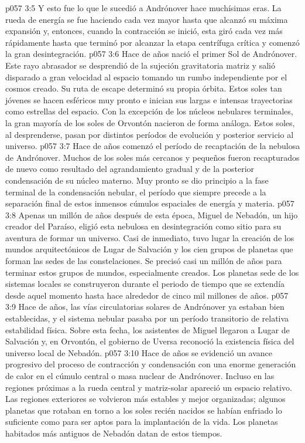 \vs p057 3:5 Y esto fue lo que le sucedió a Andrónover hace muchísimas eras. La rueda de energía se fue haciendo cada vez mayor hasta que alcanzó su máxima expansión y, entonces, cuando la contracción se inició, esta giró cada vez más rápidamente hasta que terminó por alcanzar la etapa centrífuga crítica y comenzó la gran desintegración.
\vs p057 3:6 \pc Hace  de años nació el primer Sol de Andrónover. Este rayo abrasador se desprendió de la sujeción gravitatoria matriz y salió disparado a gran velocidad al espacio tomando un rumbo independiente por el cosmos creado. Su ruta de escape determinó su propia órbita. Estos soles tan jóvenes se hacen esféricos muy pronto e inician sus largas e intensas trayectorias como estrellas del espacio. Con la excepción de los núcleos nebulares terminales, la gran mayoría de los soles de Orvontón nacieron de forma análoga. Estos soles, al desprenderse, pasan por distintos períodos de evolución y posterior servicio al universo.
\vs p057 3:7 \pc Hace  de años comenzó el período de recaptación de la nebulosa de Andrónover. Muchos de los soles más cercanos y pequeños fueron recapturados de nuevo como resultado del agrandamiento gradual y de la posterior condensación de su núcleo materno. Muy pronto se dio principio a la fase terminal de la condensación nebular, el período que siempre precede a la separación final de estos inmensos cúmulos espaciales de energía y materia.
\vs p057 3:8 Apenas un millón de años después de esta época, Miguel de Nebadón, un hijo creador del Paraíso, eligió esta nebulosa en desintegración como sitio para su aventura de formar un universo. Casi de inmediato, tuvo lugar la creación de los mundos arquitectónicos de Lugar de Salvación y los cien grupos de planetas que forman las sedes de las constelaciones. Se precisó casi un millón de años para terminar estos grupos de mundos, especialmente creados. Los planetas sede de los sistemas locales se construyeron durante el periodo de tiempo que se extendía desde aquel momento hasta hace alrededor de cinco mil millones de años.
\vs p057 3:9 \pc Hace  de años, las vías circulatorias solares de Andrónover ya estaban bien establecidas, y el sistema nebular pasaba por un período transitorio de relativa estabilidad física. Sobre esta fecha, los asistentes de Miguel llegaron a Lugar de Salvación y, en Orvontón, el gobierno de Uversa reconoció la existencia física del universo local de Nebadón.
\vs p057 3:10 \pc Hace  de años se evidenció un avance progresivo del proceso de contracción y condensación con una enorme generación de calor en el cúmulo central o masa nuclear de Andrónover. Incluso en las regiones próximas a la rueda central y matriz\hyp{}solar apareció un espacio relativo. Las regiones exteriores se volvieron más estables y mejor organizadas; algunos planetas que rotaban en torno a los soles recién nacidos se habían enfriado lo suficiente como para ser aptos para la implantación de la vida. Los planetas habitados más antiguos de Nebadón datan de estos tiempos.
